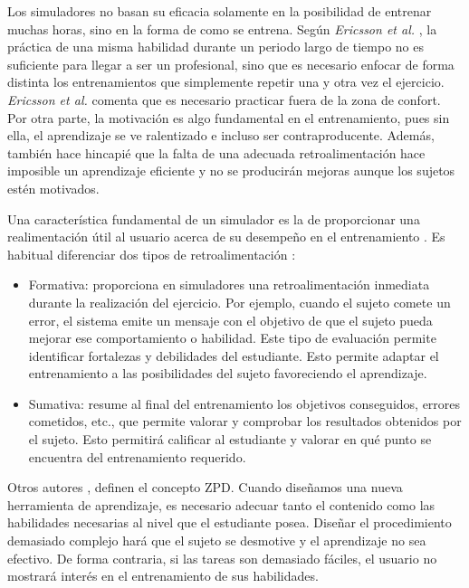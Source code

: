 Los simuladores no basan su eficacia solamente en la posibilidad de entrenar muchas horas, sino en la forma de como se entrena. Según \emph{Ericsson et al.} \cite{ericsson1993role}, la práctica de una misma habilidad durante un periodo largo de tiempo no es suficiente para llegar a ser un profesional, sino que es necesario enfocar de forma distinta los entrenamientos que simplemente repetir una y otra vez el ejercicio. \emph{Ericsson et al.} comenta que es necesario practicar fuera de la zona de confort. Por otra parte, la motivación es algo fundamental en el entrenamiento, pues sin ella, el aprendizaje se ve ralentizado e incluso ser contraproducente. Además, también hace hincapié que la falta de una adecuada retroalimentación hace imposible un aprendizaje eficiente y no se producirán mejoras aunque los sujetos estén motivados. 

Una característica fundamental de un simulador es la de proporcionar una realimentación útil al usuario acerca de su desempeño en el entrenamiento \cite{ericsson1993role}. Es habitual diferenciar dos tipos de retroalimentación \cite{Sando2013}: 
\begin{itemize}
    \item Formativa: proporciona en simuladores una retroalimentación inmediata durante la realización del ejercicio. Por ejemplo, cuando el sujeto comete un error, el sistema emite un mensaje con el objetivo de que el sujeto pueda mejorar ese comportamiento o habilidad. Este tipo de evaluación permite identificar fortalezas y debilidades del estudiante. Esto permite adaptar el entrenamiento a las posibilidades del sujeto favoreciendo el aprendizaje.
    \item Sumativa: resume al final del entrenamiento los objetivos conseguidos, errores cometidos, etc.,  que permite valorar y comprobar los resultados obtenidos por el sujeto. Esto permitirá calificar al estudiante y valorar en qué punto se encuentra del entrenamiento requerido.
\end{itemize}


Otros autores \cite{zpd}, definen el concepto \ac{ZPD}. Cuando diseñamos una nueva herramienta de aprendizaje, es necesario adecuar tanto el contenido como las habilidades necesarias al nivel que el estudiante posea. Diseñar el procedimiento demasiado complejo hará que el sujeto se desmotive y el aprendizaje no sea efectivo. De forma contraria, si las tareas son demasiado fáciles, el usuario no mostrará interés en el entrenamiento de sus habilidades.


